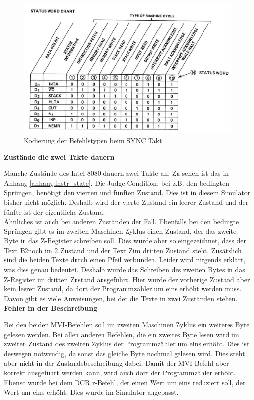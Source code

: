 \documentclass[12pt]{article}
\newcommand{\imgSpaceBefore}{\vspace{10pt}}
\begin{document}
\imgSpaceBefore
\begin{figure}[H]
\centering
\includegraphics[width=15cm]{Bilder/Intel8080_DataLines}
\caption{Kodierung der Befehlstypen beim SYNC Takt}
\label{fig:status_word}
\end{figure}

\noindent
\textbf{Zustände die zwei Takte dauern}

\noindent
Manche Zustände des Intel 8080 dauern zwei Takte an. Zu sehen ist das in Anhang \ref{anhang:instr_state}. Die Judge Condition, bei z.B. den bedingten Sprüngen, benötigt den vierten und fünften Zustand. Dies ist in diesem Simulator bisher nicht möglich. Deshalb 
wird der vierte Zustand ein leerer Zustand und der fünfte ist der eigentliche Zustand. 
\\

\noindent
Ähnliches ist auch bei anderen Zuständen der Fall. Ebenfalls bei den bedingte Sprüngen gibt es im zweiten Maschinen Zyklus einen Zustand, der das zweite Byte in das Z-Register schreiben soll. Dies wurde aber so eingezeichnet, dass der Text \glqq B2\grqq noch im 2 Zustand und der Text \glqq Z\grqq im dritten Zustand steht. Zusätzlich sind die beiden Texte durch einen Pfeil verbunden. Leider wird nirgends erklärt, was dies genau bedeutet. Deshalb wurde das Schreiben des zweiten Bytes in das Z-Register im dritten Zustand ausgeführt. Hier wurde der vorherige Zustand aber kein leerer Zustand, da dort der Programmzähler um eins erhöht werden muss. Davon gibt es viele Anweisungen, bei der die Texte in zwei Zuständen stehen.
\\

\noindent
\textbf{Fehler in der Beschreibung}

\noindent
Bei den beiden MVI-Befehlen soll im zweiten Maschinen Zyklus ein weiteres Byte gelesen werden. Bei allen anderen Befehlen, die ein zweites Byte lesen wird im zweiten Zustand des zweiten Zyklus der Programmzähler um eins erhöht. Dies ist deswegen notwendig, da sonst das gleiche Byte nochmal gelesen wird. Dies steht aber nicht in der Zustandsbeschreibung dabei. Damit der MVI-Befehl aber korrekt ausgeführt werden kann, wird auch dort der Programmzähler erhöht. Ebenso wurde bei dem DCR r-Befehl, der einen Wert um eins reduziert soll, der Wert um eins erhöht. Dies wurde im Simulator angepasst.
\\
\end{document}
